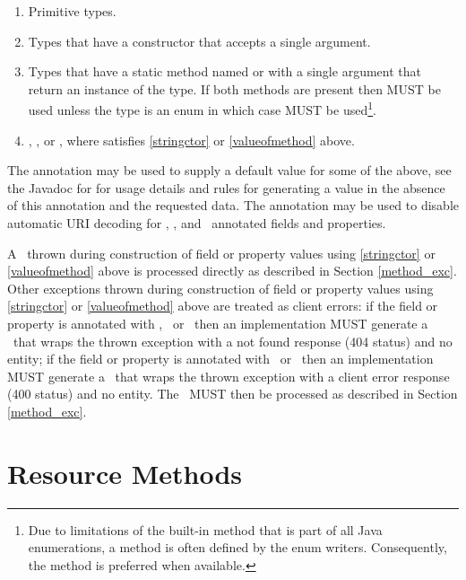 \begin{enumerate}
\item Primitive types.
\item\label{stringctor} Types that have a constructor that accepts a single  argument.
\item\label{valueofmethod} Types that have a static method named  or  with a single  argument that return an instance of the type. If both methods are present then  MUST be used unless the type is an enum in which case  MUST be used\footnote{Due to limitations of the built-in  method that is part of all Java enumerations, a  method is often defined by the enum writers. Consequently, the  method is preferred when available.}.
\item {}, , or , where  satisfies \ref{stringctor} or \ref{valueofmethod} above.
\end{enumerate}

The  annotation may be used to supply a default value for some of the above, see the Javadoc for  for usage details and rules for generating a value in the absence of this annotation and the requested data. The  annotation may be used to disable automatic URI decoding for \MatrixParam, \QueryParam, and \PathParam\ annotated fields and properties.

A \WebAppExc\ thrown during construction of field or property values using \ref{stringctor} or \ref{valueofmethod} above is processed directly as described in Section \ref{method_exc}. Other exceptions thrown during construction of field or property values using \ref{stringctor} or \ref{valueofmethod} above are treated as client errors: if the field or property is annotated with \MatrixParam, \QueryParam\ or \PathParam\ then an implementation MUST generate a \WebAppExc\ that wraps the thrown exception with a not found response (404 status) and no entity; if the field or property is annotated with \HeaderParam\ or \CookieParam\ then an implementation MUST generate a \WebAppExc\ that wraps the thrown exception with  a client error response (400 status) and no entity. The \WebAppExc\ MUST then be processed as described in Section \ref{method_exc}.

\section{Resource Methods}
\label{resource_method}

